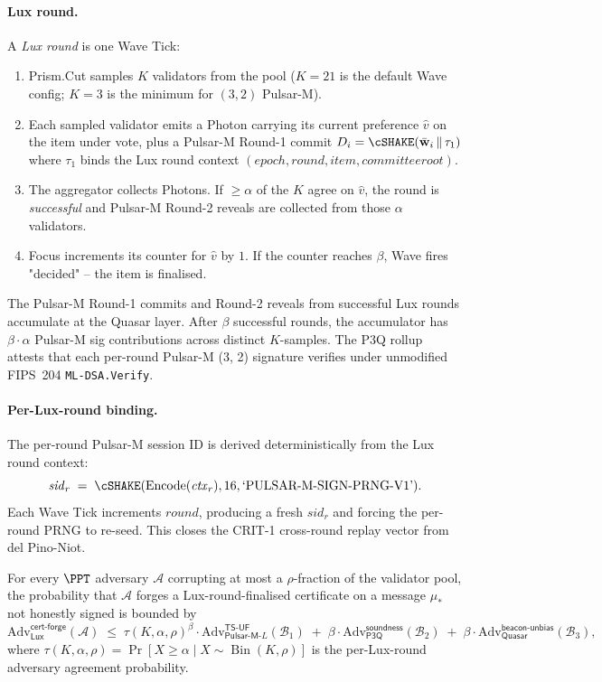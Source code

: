\paragraph{Lux round.}
A \emph{Lux round} is one Wave Tick:

\begin{enumerate}[leftmargin=*, itemsep=0pt]
\item Prism.Cut samples $K$ validators from the pool ($K = 21$ is
the default Wave config; $K = 3$ is the minimum for $(3, 2)$
Pulsar-M).
\item Each sampled validator emits a Photon carrying its current
preference $\hat v$ on the item under vote, plus a Pulsar-M
Round-1 commit $D_i = \cSHAKE(\bar{\mathbf{w}}_i\,\|\,\tau_1)$ where
$\tau_1$ binds the Lux round context $(\mathit{epoch}, \mathit{round},
\mathit{item}, \mathit{committee root})$.
\item The aggregator collects Photons. If $\ge \alpha$ of the $K$
agree on $\hat v$, the round is \emph{successful} and Pulsar-M
Round-2 reveals are collected from those $\alpha$ validators.
\item Focus increments its counter for $\hat v$ by $1$. If the
counter reaches $\beta$, Wave fires "decided" -- the item is
finalised.
\end{enumerate}

The Pulsar-M Round-1 commits and Round-2 reveals from successful
Lux rounds accumulate at the Quasar layer. After $\beta$ successful
rounds, the accumulator has $\beta \cdot \alpha$ Pulsar-M sig
contributions across distinct $K$-samples. The P3Q rollup attests
that each per-round Pulsar-M (3, 2) signature verifies under
unmodified FIPS~204 \texttt{ML-DSA.Verify}.

\paragraph{Per-Lux-round binding.}
The per-round Pulsar-M session ID is derived deterministically from
the Lux round context:
\[
  \mathit{sid}_r \;=\; \cSHAKE(\text{Encode}(\mathit{ctx}_r), 16, \text{`PULSAR-M-SIGN-PRNG-V1'}).
\]
Each Wave Tick increments $\mathit{round}$, producing a fresh
$\mathit{sid}_r$ and forcing the per-round PRNG to re-seed. This
closes the CRIT-1 cross-round replay vector from del Pino-Niot.

\begin{theorem}
\label{thm:lux-round-metastable}
For every $\PPT$ adversary $\mathcal{A}$ corrupting at most a
$\rho$-fraction of the validator pool, the probability that
$\mathcal{A}$ forges a Lux-round-finalised certificate on a message
$\mu_*$ not honestly signed is bounded by
\[
  \mathrm{Adv}^{\mathsf{cert\text{-}forge}}_{\mathsf{Lux}}(\mathcal{A})
  \;\le\;
  \tau(K, \alpha, \rho)^\beta
  \cdot \mathrm{Adv}^{\mathsf{TS\text{-}UF}}_{\mathsf{Pulsar\text{-}M}\text{-}L}(\mathcal{B}_1)
  \;+\;
  \beta \cdot \mathrm{Adv}^{\mathsf{soundness}}_{\mathsf{P3Q}}(\mathcal{B}_2)
  \;+\;
  \beta \cdot \mathrm{Adv}^{\mathsf{beacon\text{-}unbias}}_{\mathsf{Quasar}}(\mathcal{B}_3),
\]
where $\tau(K, \alpha, \rho) = \Pr[X \ge \alpha \mid X \sim
\operatorname{Bin}(K, \rho)]$ is the per-Lux-round adversary
agreement probability.
\end{theorem}

